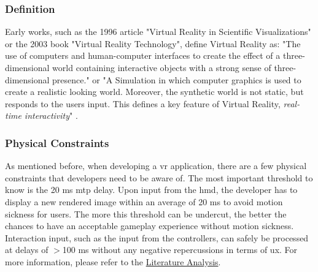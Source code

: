 \subsubsection{Definition}
Early works, such as the 1996 article "Virtual Reality in Scientific Visualizations"  or the 2003 book "Virtual Reality Technology", define Virtual Reality as: "The use of computers and human\hyp{}computer interfaces to create the effect of a three\hyp{}dimensional world containing interactive objects with a strong sense of three\hyp{}dimensional presence."\parencite{vrsv} or "A Simulation in which computer graphics is used to create a realistic looking world. Moreover, the synthetic world is not static, but responds to the users input. This defines a key feature of Virtual Reality, \textit{real\hyp{}time interactivity}" \parencite{vrtech}.

\subsubsection{Physical Constraints}

As mentioned before, when developing a \acrshort{vr} application, there are a few physical constraints that developers need to be aware of. The most important threshold to know is the 20 \acrshort{ms} \acrfull{mtp} delay. Upon input from the \acrfull{hmd}, the developer has to display a new rendered image within an average of 20 \acrshort{ms} to avoid motion sickness for users. The more this threshold can be undercut, the better the chances to have an acceptable gameplay experience without motion sickness. Interaction input, such as the input from the controllers, can safely be processed at delays of $>$100 \acrshort{ms} without any negative repercussions in terms of \acrfull{ux}. For more information, please refer to the \hyperref[sec:lit]{Literature Analysis}.